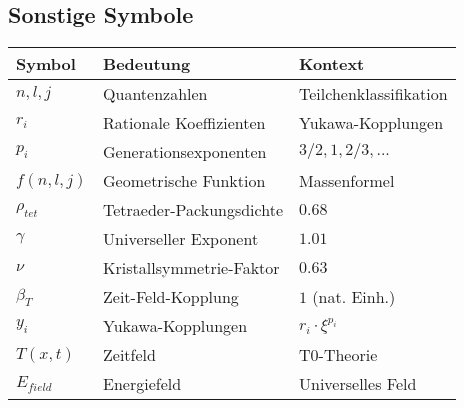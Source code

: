 \documentclass[12pt,a4paper]{article}
\theoremstyle{definition}
\begin{document}
\subsection{Sonstige Symbole}
\begin{longtable}{lll}
	\toprule
	\textbf{Symbol} & \textbf{Bedeutung} & \textbf{Kontext} \\
	\midrule
	$n, l, j$ & Quantenzahlen & Teilchenklassifikation \\
	$r_i$ & Rationale Koeffizienten & Yukawa-Kopplungen \\
	$p_i$ & Generationsexponenten & $3/2, 1, 2/3, ...$ \\
	$f(n,l,j)$ & Geometrische Funktion & Massenformel \\
	$\rho_{tet}$ & Tetraeder-Packungsdichte & $0.68$ \\
	$\gamma$ & Universeller Exponent & $1.01$ \\
	$\nu$ & Kristallsymmetrie-Faktor & $0.63$ \\
	$\beta_T$ & Zeit-Feld-Kopplung & $1$ (nat. Einh.) \\
	$y_i$ & Yukawa-Kopplungen & $r_i \cdot \xi^{p_i}$ \\
	$T(x,t)$ & Zeitfeld & T0-Theorie \\
	$E_{field}$ & Energiefeld & Universelles Feld \\
	\bottomrule
\end{longtable}
\end{document}
